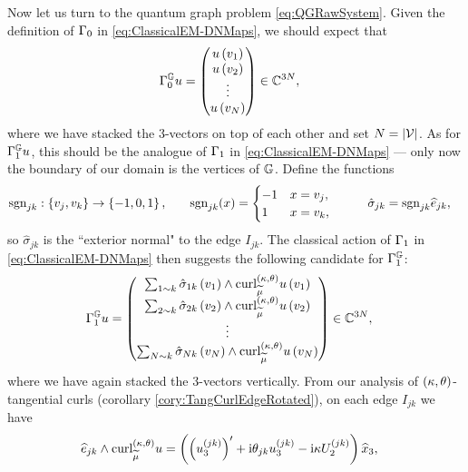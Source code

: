 Now let us turn to the quantum graph problem \eqref{eq:QGRawSystem}.
Given the definition of $\Gamma_0$ in \eqref{eq:ClassicalEM-DNMaps}, we should expect that
\begin{align} \label{eq:DGMapDef}
	\Gamma_0^{\mathbb{G}} u &= 
	\begin{pmatrix}
		u\left( v_1 \right) \\ u\left( v_2 \right) \\ \vdots \\ u\left( v_N \right)
	\end{pmatrix}
	\in\mathbb{C}^{3N},
\end{align}
where we have stacked the 3-vectors on top of each other and set $N=\left\lvert \mathcal{V} \right\rvert$.
As for $\Gamma_1^{\mathbb{G}} u$, this should be the analogue of $\Gamma_1$ in \eqref{eq:ClassicalEM-DNMaps} --- only now the boundary of our domain is the vertices of $\mathbb{G}$.
Define the functions 
\begin{align*}
	\mathrm{sgn}_{jk}: \left\{ v_j, v_k \right\} \rightarrow \left\{ -1,0,1 \right\}, 
	&\qquad
	\mathrm{sgn}_{jk}(x) = \begin{cases} -1 & x=v_j, \\ 1 & x=v_k, \end{cases}
	&\qquad
	\hat{\sigma}_{jk} &= \mathrm{sgn}_{jk}\widehat{e}_{jk},
\end{align*}
so $\hat{\sigma}_{jk}$ is the ``exterior normal" to the edge $I_{jk}$.
The classical action of $\Gamma_1$ in \eqref{eq:ClassicalEM-DNMaps} then suggests the following candidate for $\Gamma_1^{\mathbb{G}}$:
\begin{align} \label{eq:NGMapDef}
	\Gamma_1^{\mathbb{G}} u &= 
	\begin{pmatrix}
		\sum_{1\sim k} \hat{\sigma}_{1k}\left( v_1 \right)\wedge\mathrm{curl}_{\widetilde{\mu}}^{\left( \kappa, \theta \right)}u\left( v_1 \right) \\
		\sum_{2\sim k} \hat{\sigma}_{2k}\left( v_2 \right)\wedge\mathrm{curl}_{\widetilde{\mu}}^{\left( \kappa, \theta \right)}u\left( v_2 \right) \\
		\vdots \\
		\sum_{N\sim k} \hat{\sigma}_{Nk}\left( v_N \right)\wedge\mathrm{curl}_{\widetilde{\mu}}^{\left( \kappa, \theta \right)}u\left( v_N \right)
	\end{pmatrix}
	\in\mathbb{C}^{3N},
\end{align}
where we have again stacked the 3-vectors vertically.
From our analysis of $\left( \kappa, \theta \right)$-tangential curls (corollary \ref{cory:TangCurlEdgeRotated}), on each edge $I_{jk}$ we have
\begin{align*}
	\widehat{e}_{jk}\wedge\mathrm{curl}_{\widetilde{\mu}}^{\left( \kappa, \theta \right)}u &= \left(  \left(  u_3^{(jk)}  \right)' + \mathrm{i}\theta_{jk}u_3^{(jk)} - \mathrm{i}\kappa U_2^{(jk)}  \right)\widehat{x}_3,
\end{align*}
